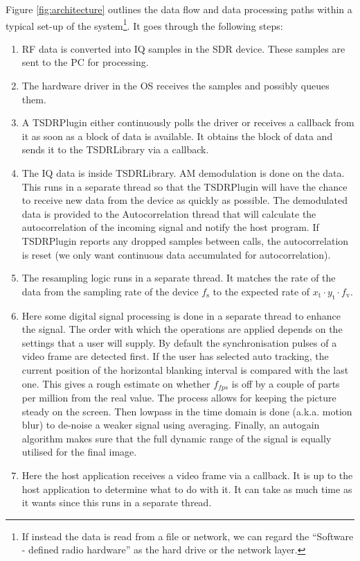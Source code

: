 \documentclass[a4paper,12pt,twoside,openright]{report}
\begin{document}
Figure \ref{fig:architecture} outlines the data flow and data processing paths within a typical set-up of the system\footnote{If instead the data is read from a file or network, we can regard the ``Software - defined radio hardware'' as the hard drive or the network layer.}. It goes through the following steps:

\begin{enumerate}
	\item RF data is converted into IQ samples in the SDR device. These samples are sent to the PC for processing.
	\item The hardware driver in the OS receives the samples and possibly queues them.
	\item A TSDRPlugin either continuously polls the driver or receives a callback from it as soon as a block of data is available. It obtains the block of data and sends it to the TSDRLibrary via a callback.
	\item The IQ data is inside TSDRLibrary. AM demodulation is done on the data. This runs in a separate thread so that the TSDRPlugin will have the chance to receive new data from the device as quickly as possible. The demodulated data is provided to the Autocorrelation thread that will calculate the autocorrelation of the incoming signal and notify the host program. If TSDRPlugin reports any dropped samples between calls, the autocorrelation is reset (we only want continuous data accumulated for autocorrelation).
	\item The resampling logic runs in a separate thread. It matches the rate of the data from the sampling rate of the device $f_\text{s}$ to the expected rate of $x_\text{t} \cdot y_\text{t} \cdot f_\text{v}$.
	\item Here some digital signal processing is done in a separate thread to enhance the signal. The order with which the operations are applied depends on the settings that a user will supply. By default the synchronisation pulses of a video frame are detected first. If the user has selected auto tracking, the current position of the horizontal blanking interval is compared with the last one. This gives a rough estimate on whether $f_{fps}$ is off by a couple of parts per million from the real value. The process allows for keeping the picture steady on the screen. Then lowpass in the time domain is done (a.k.a. motion blur) to de-noise a weaker signal using averaging. Finally, an autogain algorithm makes sure that the full dynamic range of the signal is equally utilised for the final image.
	\item Here the host application receives a video frame via a callback. It is up to the host application to determine what to do with it. It can take as much time as it wants since this runs in a separate thread.

\end{enumerate}
\end{document}
